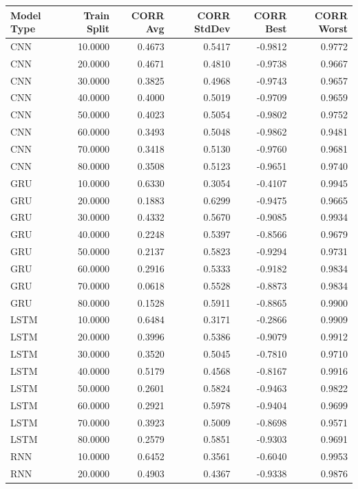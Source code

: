 \begin{tabular}{lrrrrr}
\toprule
Model Type & Train Split & CORR Avg & CORR StdDev & CORR Best & CORR Worst \\
\midrule
CNN & 10.0000 & 0.4673 & 0.5417 & -0.9812 & 0.9772 \\
CNN & 20.0000 & 0.4671 & 0.4810 & -0.9738 & 0.9667 \\
CNN & 30.0000 & 0.3825 & 0.4968 & -0.9743 & 0.9657 \\
CNN & 40.0000 & 0.4000 & 0.5019 & -0.9709 & 0.9659 \\
CNN & 50.0000 & 0.4023 & 0.5054 & -0.9802 & 0.9752 \\
CNN & 60.0000 & 0.3493 & 0.5048 & -0.9862 & 0.9481 \\
CNN & 70.0000 & 0.3418 & 0.5130 & -0.9760 & 0.9681 \\
CNN & 80.0000 & 0.3508 & 0.5123 & -0.9651 & 0.9740 \\
GRU & 10.0000 & 0.6330 & 0.3054 & -0.4107 & 0.9945 \\
GRU & 20.0000 & 0.1883 & 0.6299 & -0.9475 & 0.9665 \\
GRU & 30.0000 & 0.4332 & 0.5670 & -0.9085 & 0.9934 \\
GRU & 40.0000 & 0.2248 & 0.5397 & -0.8566 & 0.9679 \\
GRU & 50.0000 & 0.2137 & 0.5823 & -0.9294 & 0.9731 \\
GRU & 60.0000 & 0.2916 & 0.5333 & -0.9182 & 0.9834 \\
GRU & 70.0000 & 0.0618 & 0.5528 & -0.8873 & 0.9834 \\
GRU & 80.0000 & 0.1528 & 0.5911 & -0.8865 & 0.9900 \\
LSTM & 10.0000 & 0.6484 & 0.3171 & -0.2866 & 0.9909 \\
LSTM & 20.0000 & 0.3996 & 0.5386 & -0.9079 & 0.9912 \\
LSTM & 30.0000 & 0.3520 & 0.5045 & -0.7810 & 0.9710 \\
LSTM & 40.0000 & 0.5179 & 0.4568 & -0.8167 & 0.9916 \\
LSTM & 50.0000 & 0.2601 & 0.5824 & -0.9463 & 0.9822 \\
LSTM & 60.0000 & 0.2921 & 0.5978 & -0.9404 & 0.9699 \\
LSTM & 70.0000 & 0.3923 & 0.5009 & -0.8698 & 0.9571 \\
LSTM & 80.0000 & 0.2579 & 0.5851 & -0.9303 & 0.9691 \\
RNN & 10.0000 & 0.6452 & 0.3561 & -0.6040 & 0.9953 \\
RNN & 20.0000 & 0.4903 & 0.4367 & -0.9338 & 0.9876 \\

\end{tabular}
